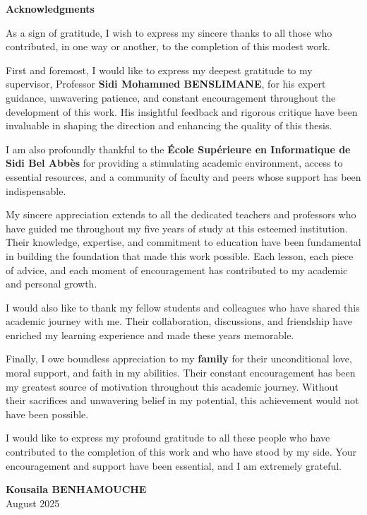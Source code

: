 \thispagestyle{empty}

\begin{center}
{\Large \textbf{Acknowledgments}}
\end{center}

\vspace{1cm}

As a sign of gratitude, I wish to express my sincere thanks to all those who contributed, in one way or another, to the completion of this modest work.

First and foremost, I would like to express my deepest gratitude to my supervisor, Professor \textbf{Sidi Mohammed BENSLIMANE}, for his expert guidance, unwavering patience, and constant encouragement throughout the development of this work. His insightful feedback and rigorous critique have been invaluable in shaping the direction and enhancing the quality of this thesis.

I am also profoundly thankful to the \textbf{École Supérieure en Informatique de Sidi Bel Abbès} for providing a stimulating academic environment, access to essential resources, and a community of faculty and peers whose support has been indispensable.

My sincere appreciation extends to all the dedicated teachers and professors who have guided me throughout my five years of study at this esteemed institution. Their knowledge, expertise, and commitment to education have been fundamental in building the foundation that made this work possible. Each lesson, each piece of advice, and each moment of encouragement has contributed to my academic and personal growth.

I would also like to thank my fellow students and colleagues who have shared this academic journey with me. Their collaboration, discussions, and friendship have enriched my learning experience and made these years memorable.

Finally, I owe boundless appreciation to my \textbf{family} for their unconditional love, moral support, and faith in my abilities. Their constant encouragement has been my greatest source of motivation throughout this academic journey. Without their sacrifices and unwavering belief in my potential, this achievement would not have been possible.

I would like to express my profound gratitude to all these people who have contributed to the completion of this work and who have stood by my side. Your encouragement and support have been essential, and I am extremely grateful.

\vspace{2cm}

\begin{flushright}
\textbf{Kousaila BENHAMOUCHE}\\
August 2025
\end{flushright}

\newpage